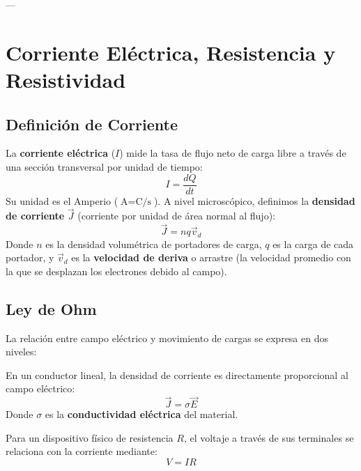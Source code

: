\documentclass[12pt, a4paper]{article}
\begin{document}
---

\section{Corriente Eléctrica, Resistencia y Resistividad}

\subsection{Definición de Corriente}
La \textbf{corriente eléctrica} ($I$) mide la tasa de flujo neto de carga libre a través de una sección transversal por unidad de tiempo:
\begin{equation}
    I = \frac{dQ}{dt}
\end{equation}
Su unidad es el Amperio ($\text{A} = \text{C/s}$). A nivel microscópico, definimos la \textbf{densidad de corriente} $\vec{J}$ (corriente por unidad de área normal al flujo):
\begin{equation}
    \vec{J} = n q \vec{v}_d
\end{equation}
Donde $n$ es la densidad volumétrica de portadores de carga, $q$ es la carga de cada portador, y $\vec{v}_d$ es la \textbf{velocidad de deriva} o arrastre (la velocidad promedio con la que se desplazan los electrones debido al campo).

\subsection{Ley de Ohm}
La relación entre campo eléctrico y movimiento de cargas se expresa en dos niveles:

\begin{definicion}
En un conductor lineal, la densidad de corriente es directamente proporcional al campo eléctrico:
\begin{equation}
    \vec{J} = \sigma \vec{E}
\end{equation}
Donde $\sigma$ es la \textbf{conductividad eléctrica} del material.
\end{definicion}

\begin{definicion}
Para un dispositivo físico de resistencia $R$, el voltaje a través de sus terminales se relaciona con la corriente mediante:
\begin{equation}
    V = I R
\end{equation}
\end{definicion}
\end{document}
